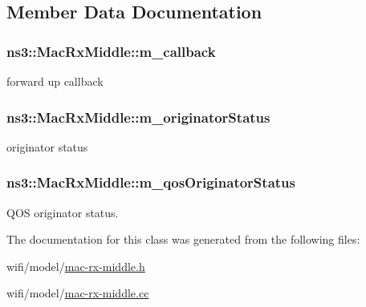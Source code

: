 \subsection{Member Data Documentation}
\subsubsection[{\texorpdfstring{m\+\_\+callback}{m_callback}}]{ ns3\+::\+Mac\+Rx\+Middle\+::m\+\_\+callback\hspace{0.3cm}{\ttfamily [private]}}\hypertarget{classns3_1_1MacRxMiddle_aba181a02e2199e5d4093d9ce51646f94}{}\label{classns3_1_1MacRxMiddle_aba181a02e2199e5d4093d9ce51646f94}


forward up callback 

\subsubsection[{\texorpdfstring{m\+\_\+originator\+Status}{m_originatorStatus}}]{ ns3\+::\+Mac\+Rx\+Middle\+::m\+\_\+originator\+Status\hspace{0.3cm}{\ttfamily [private]}}\hypertarget{classns3_1_1MacRxMiddle_a1938c454885267867365a04ae45a1fcb}{}\label{classns3_1_1MacRxMiddle_a1938c454885267867365a04ae45a1fcb}


originator status 

\subsubsection[{\texorpdfstring{m\+\_\+qos\+Originator\+Status}{m_qosOriginatorStatus}}]{ ns3\+::\+Mac\+Rx\+Middle\+::m\+\_\+qos\+Originator\+Status\hspace{0.3cm}{\ttfamily [private]}}\hypertarget{classns3_1_1MacRxMiddle_a80a0db4db3281d8bffc08cf5f989ab6e}{}\label{classns3_1_1MacRxMiddle_a80a0db4db3281d8bffc08cf5f989ab6e}


Q\+OS originator status. 



The documentation for this class was generated from the following files\+:\begin{DoxyCompactItemize}
\item 
wifi/model/\hyperlink{mac-rx-middle_8h}{mac-\/rx-\/middle.\+h}\item 
wifi/model/\hyperlink{mac-rx-middle_8cc}{mac-\/rx-\/middle.\+cc}\end{DoxyCompactItemize}
